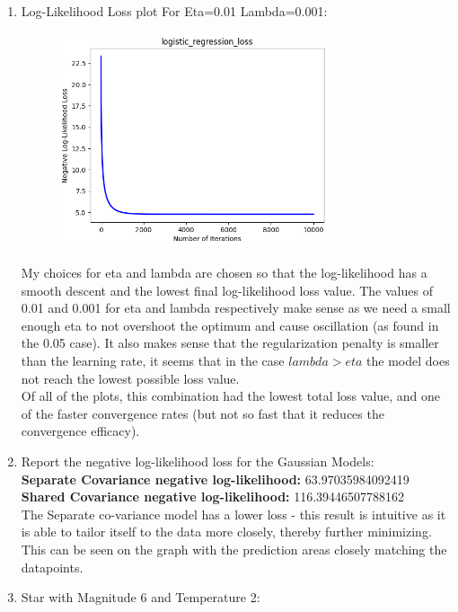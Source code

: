 \documentclass[submit]{harvardml}
\begin{document}
\begin{enumerate}
\begin{enumerate}
\begin{figure}[H]
            \centering
        \end{figure}
    \end{enumerate}
    \item Log-Likelihood Loss plot For Eta=0.01 Lambda=0.001:
    \begin{figure}[H]
        \includegraphics[width=8cm]{hw2/P3_plots/logistic_regression_loss.png}
        \centering
    \end{figure}
    My choices for eta and lambda are chosen so that the log-likelihood has a smooth descent and the lowest final log-likelihood loss value. The values of 0.01 and 0.001 for eta and lambda respectively make sense as we need a small enough eta to not overshoot the optimum and cause oscillation (as found in the  0.05 case). It also makes sense that the regularization penalty is smaller than the learning rate, it seems that in the case $lambda>eta$ the model does not reach the lowest possible loss value.\\
    Of all of the plots, this combination had the lowest total loss value, and one of the faster convergence rates (but not so fast that it reduces the convergence efficacy).
    \item Report the negative log-likelihood loss for the Gaussian Models:\\
    \textbf{Separate Covariance negative log-likelihood:} 63.97035984092419 \\
    \textbf{Shared Covariance negative log-likelihood:} 116.39446507788162
    \\
    The Separate co-variance model has a lower loss - this result is intuitive as it is able to tailor itself to the data more closely, thereby further minimizing. This can be seen on the graph with the prediction areas closely matching the datapoints.\\
    \item Star with Magnitude 6 and Temperature 2:
    \begin{enumerate}

\end{enumerate}
\end{enumerate}
\end{document}
